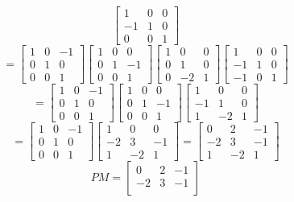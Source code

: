 \documentclass[openany]{book}
\begin{document}
\begin{itemize}
\begin{itemize}
$$\begin{bmatrix}
1 & 0 & 0 \\
-1 & 1 & 0 \\
0 & 0 & 1
\end{bmatrix}$$
$$= \begin{bmatrix}
1 & 0 & -1 \\
0 & 1 & 0 \\
0 & 0 & 1
\end{bmatrix}\begin{bmatrix}
1 & 0 & 0 \\
0 & 1 & -1 \\
0 & 0 & 1
\end{bmatrix}\begin{bmatrix}
1 & 0 & 0 \\
0 & 1 & 0 \\
0 & -2 & 1
\end{bmatrix}\begin{bmatrix}
1 & 0 & 0 \\
-1 & 1 & 0 \\
-1 & 0 & 1
\end{bmatrix}$$
$$= \begin{bmatrix}
1 & 0 & -1 \\
0 & 1 & 0 \\
0 & 0 & 1
\end{bmatrix}\begin{bmatrix}
1 & 0 & 0 \\
0 & 1 & -1 \\
0 & 0 & 1
\end{bmatrix}\begin{bmatrix}
1 & 0 & 0 \\
-1 & 1 & 0 \\
1 & -2 & 1
\end{bmatrix}$$
$$= \begin{bmatrix}
1 & 0 & -1 \\
0 & 1 & 0 \\
0 & 0 & 1
\end{bmatrix}\begin{bmatrix}
1 & 0 & 0 \\
-2 & 3 & -1 \\
1 & -2 & 1
\end{bmatrix} = \begin{bmatrix}
0 & 2 & -1 \\
-2 & 3 & -1 \\
1 & -2 & 1
\end{bmatrix}$$
$$PM = \begin{bmatrix}
0 & 2 & -1 \\
-2 & 3 & -1 \\

\end{bmatrix}$$
\end{itemize}
\end{itemize}
\end{document}
